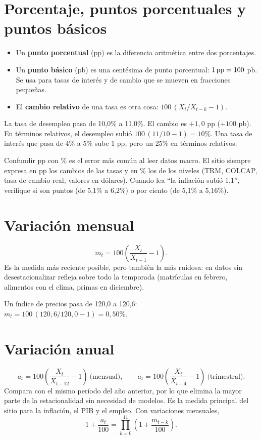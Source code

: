 \section{Porcentaje, puntos porcentuales y puntos básicos}
\label{es:f:pp}
\begin{itemize}
\item Un \textbf{punto porcentual} (pp) es la diferencia aritmética entre dos porcentajes.
\item Un \textbf{punto básico} (pb) es una centésima de punto porcentual: $1\,\text{pp} = 100$ pb. Se usa para tasas de
  interés y de cambio que se mueven en fracciones pequeñas.
\item El \textbf{cambio relativo} de una tasa es otra cosa: $100\,(X_t/X_{t-k}-1)$.
\end{itemize}

\begin{dato}
La tasa de desempleo pasa de 10,0\% a 11,0\%. El cambio es $+1{,}0$ pp ($+100$ pb). En términos relativos,
el desempleo subió $100\,(11/10-1)=10\%$. Una tasa de interés que pasa de 4\% a 5\% sube 1 pp, pero un 25\% en
términos relativos.
\end{dato}

\begin{alerta}
Confundir pp con \% es el error más común al leer datos macro. El sitio siempre expresa en pp los cambios de las
tasas y en \% los de los niveles (TRM, COLCAP, tasa de cambio real, valores en dólares). Cuando lea ``la inflación
subió 1,1'', verifique si son puntos (de 5,1\% a 6,2\%) o por ciento (de 5,1\% a 5,16\%).
\end{alerta}

\section{Variación mensual}
\[
m_t = 100\left(\frac{X_t}{X_{t-1}}-1\right).
\]
Es la medida más reciente posible, pero también la más ruidosa: en datos sin desestacionalizar refleja sobre todo
la temporada (matrículas en febrero, alimentos con el clima, primas en diciembre).

\begin{dato}
Un índice de precios pasa de 120,0 a 120,6: $m_t=100\,(120{,}6/120{,}0-1)=0{,}50\%$.
\end{dato}

\section{Variación anual}
\[
a_t = 100\left(\frac{X_t}{X_{t-12}}-1\right)\ \text{(mensual)},\qquad
a_t = 100\left(\frac{X_t}{X_{t-4}}-1\right)\ \text{(trimestral)}.
\]
Compara con el mismo período del año anterior, por lo que elimina la mayor parte de la estacionalidad sin necesidad
de modelos. Es la medida principal del sitio para la inflación, el PIB y el empleo. Con variaciones mensuales,
\[
1+\frac{a_t}{100}=\prod_{k=0}^{11}\left(1+\frac{m_{t-k}}{100}\right).
\]

